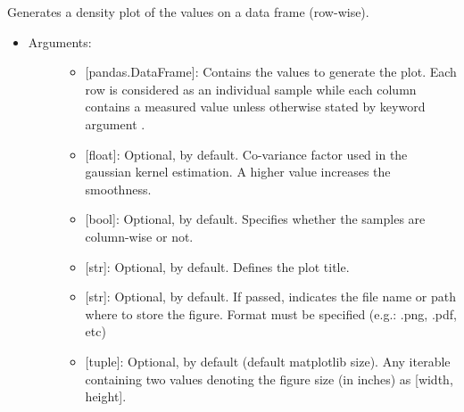 \documentclass[letterpaper,10pt,english]{sphinxmanual}
\begin{document}
\begin{fulllineitems}
\label{\detokenize{plots:data_tools.plots.density}}
Generates a density plot of the values on a data frame (row-wise).
\begin{itemize}
\item {} \begin{description}
\item[{Arguments:}] \leavevmode\begin{itemize}
\item {} 
 {[}pandas.DataFrame{]}: Contains the values to generate the
plot. Each row is considered as an individual sample while
each column contains a measured value unless otherwise stated
by keyword argument .

\item {} 
 {[}float{]}: Optional,  by default. Co-variance
factor used in the gaussian kernel estimation. A higher value
increases the smoothness.

\item {} 
 {[}bool{]}: Optional,  by default. Specifies
whether the samples are column-wise or not.

\item {} 
 {[}str{]}: Optional,  by default. Defines the plot
title.

\item {} 
 {[}str{]}: Optional,  by default. If passed,
indicates the file name or path where to store the figure.
Format must be specified (e.g.: .png, .pdf, etc)

\item {} 
 {[}tuple{]}: Optional,  by default (default
matplotlib size). Any iterable containing two values denoting
the figure size (in inches) as {[}width, height{]}.

\end{itemize}

\end{description}


\end{itemize}
\end{fulllineitems}
\end{document}

